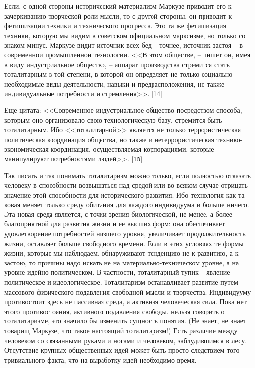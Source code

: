 \documentclass{book}
\begin{document}
Если, с одной стороны исторический материализм Маркузе приводит его к зачеркиванию творческой роли мысли, то с дру­гой стороны, он приводит к фетишизации техники и техниче­ского прогресса. Это та же фетишизация техники, которую мы видим в советском официальном марксизме, но только со знаком минус. Маркузе видит источник всех бед -- точнее, источник застоя -- в современной промышленной технологии. <<В этом обществе, -- пишет он, имея в виду индустриальное общество, -- аппарат производства стремится стать тоталитар­ным в той степени, в которой он определяет не только соци­ально необходимые виды деятельности, навыки и предрасполо­жения, но также индивидуальные потребности и стремления>>. [14]

Еще цитата: <<Современное индустриальное общество посред­ством способа, которым оно организовало свою технологиче­скую базу, стремится быть тоталитарным. Ибо <<тоталитарной>> является не только террористическая политическая коорди­нация общества, но также и нетеррористическая технико-эко­номическая координация, осуществляемая корпорациями, кото­рые манипулируют потребностями людей>>. [15]

Так писать и так понимать тоталитаризм можно только, ес­ли полностью отказать человеку в способности возвышаться над средой или во всяком случае отрицать значение этой спо­собности для исторического развития. Ибо технология как та­ковая меняет только среду обитания  для каждого индивиду­ума и больше ничего. Эта новая среда является, с точки зрения биологической, не менее, а более благоприятной для развития жизни и ее высших форм: она обеспечивает удовлетворение потребностей низшего уровня, увеличивает продолжительность жизни, оставляет больше свободного времени. Если в этих ус­ловиях те формы жизни, которые мы наблюдаем, обнаружи­вают тенденцию не к развитию, а к застою, то причины надо ис­кать не на материально-техническом уровне, а на уровне идей­но-политическом. В частности, тоталитарный тупик -- явление политическое и идеологическое. Тоталитаризм останавливает развитие путем массового физического подавления свободной мысли и творчества. Индивидууму противостоит здесь не пассив­ная среда, а активная 
человеческая сила. Пока нет этого проти­востояния, активного подавления свободы, нельзя говорить о тоталитаризме, это значило бы изменить сущность понятия. (Не знает, не знает товарищ Маркузе, что такое настоящий то­талитаризм!) Есть различие между человеком со связанными руками и ногами и человеком, заблудившимся в лесу. Отсутст­вие крупных общественных идей может быть просто следстви­ем того тривиального факта, что на выработку идей необхо­димо время. 
\end{document}
